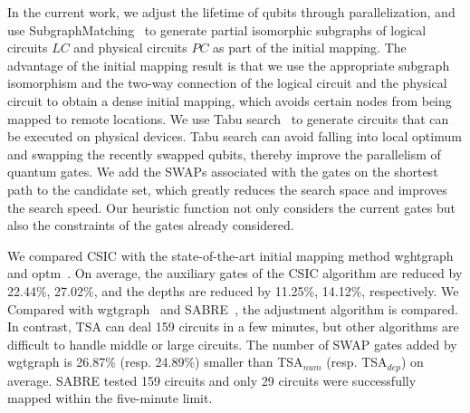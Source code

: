 \documentclass[runningheads]{llncs}
\begin{document}
In the current work, we adjust the lifetime of qubits through parallelization, and use SubgraphMatching~\cite{Sun2020} to generate partial isomorphic subgraphs of logical circuits $LC$ and physical circuits $PC$ as part of the initial mapping. The advantage of the initial mapping result is that we use the appropriate subgraph isomorphism and the two-way connection of the logical circuit and the physical circuit to obtain a dense initial mapping, which avoids certain nodes from being mapped to remote locations. We use Tabu search~\cite{Glover1990} to generate circuits that can be executed on physical devices. Tabu search can avoid falling into local optimum and swapping the recently swapped qubits, thereby improve the parallelism of quantum gates. We add the  SWAPs associated with the gates on the shortest path to the candidate set, which greatly reduces the search space and improves the search speed. Our heuristic function not only considers the current gates but also the constraints of the gates already considered.

We compared CSIC with the state-of-the-art initial mapping method wghtgraph~\cite{2020Qubit} and optm~\cite{Zulehner2017}. On average, the auxiliary gates of the CSIC algorithm are reduced by 22.44\%, 27.02\%, and the depths are reduced by 11.25\%, 14.12\%, respectively. We Compared with wgtgraph~\cite{2020Qubit} and SABRE~\cite{Li2018}, the adjustment algorithm is compared. In contrast, TSA can deal 159 circuits in a few minutes, but other algorithms are difficult to handle middle or large circuits. The number of SWAP gates added by wgtgraph is 26.87\% (resp. 24.89\%) smaller than TSA$_{num}$ (resp. TSA$_{dep}$) on average. SABRE tested 159 circuits and only 29 circuits were successfully mapped within the five-minute limit.
\end{document}
